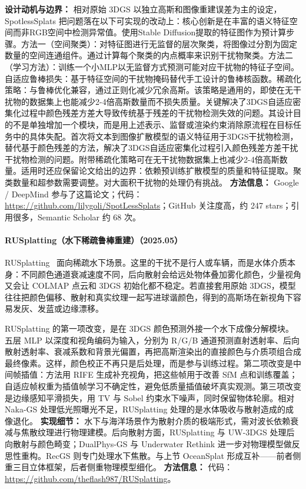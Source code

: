 \textbf{设计动机与边界：} 相对原始 3DGS 以独立高斯和图像重建误差为主的设定，SpotlessSplats 把问题落在以下可实现的改动上：核心创新是在丰富的语义特征空间而非RGB空间中检测异常值。使用Stable Diffusion提取的特征图作为预计算步骤。方法一（空间聚类）：对特征图进行无监督的层次聚类，将图像过分割为固定数量的空间连通组件。通过计算每个聚类的内点概率来识别干扰物聚类。方法二（学习方法）：训练一个小MLP以无监督方式预测可能对应干扰物的特征子空间。自适应鲁棒损失：基于特征空间的干扰物掩码替代手工设计的鲁棒核函数。稀疏化策略：与鲁棒优化兼容，通过正则化减少冗余高斯。该策略是通用的，即使在无干扰物的数据集上也能减少2-4倍高斯数量而不损失质量。关键解决了3DGS自适应密集化过程中颜色残差方差大导致传统基于残差的干扰物检测失效的问题。其设计目的不是单独增加一个模块，而是用上述表示、监督或渲染约束消除原流程在目标任务中的具体失配。首次将文本到图像扩散模型的语义特征用于3DGS干扰物检测，替代基于颜色残差的方法，解决了3DGS自适应密集化过程引入颜色残差方差干扰干扰物检测的问题。附带稀疏化策略可在无干扰物数据集上也减少2-4倍高斯数量。适用时还应保留论文给出的边界：依赖预训练扩散模型的质量和特征提取。聚类数量和超参数需要调整。对大面积干扰物的处理仍有挑战。
\textbf{方法信息：} Google / DeepMind 参与了这篇论文；代码：\url{https://github.com/lilygoli/SpotLessSplats}；GitHub 关注度高，约 247 stars；引用很多，Semantic Scholar 约 68 次。



\paragraph{RUSplatting（水下稀疏鲁棒重建）（2025.05）}
RUSplatting~\cite{2505_15737} 面向稀疏水下场景。这里的干扰不是行人或车辆，而是水体介质本身：不同颜色通道衰减速度不同，后向散射会给远处物体叠加雾化颜色，少量视角又会让 COLMAP 点云和 3DGS 初始化都不稳定。若直接套用原始 3DGS，模型往往把颜色偏移、散射和真实纹理一起写进球谐颜色，得到的高斯场在新视角下容易发灰、发蓝或边缘漂移。

RUSplatting 的第一项改变，是在 3DGS 颜色预测外接一个水下成像分解模块。五层 MLP 以深度和视角编码为输入，分别为 R/G/B 通道预测直射透射率、后向散射透射率、衰减系数和背景光偏置，再把高斯渲染出的直接颜色与介质项组合成最终像素。这样，颜色校正不再只是后处理，而是参与训练过程。第二项改变是中间帧插值：方法用 RIFE 生成补充视角，把这些帧用于改善 SfM 点和训练覆盖；自适应帧权重为插值帧学习不确定性，避免低质量插值破坏真实观测。第三项改变是边缘感知平滑损失，用 TV 与 Sobel 约束水下噪声，同时保留物体轮廓。相对 Naka-GS 处理低光照曝光不足，RUSplatting 处理的是水体吸收与散射造成的成像退化。
\textbf{实现细节：} 水下与海洋场景作为散射介质的极端形式，需对波长依赖衰减与焦散纹理进行物理建模。后向散射方面，RUSplatting 与 UW-3DGS 处理后向散射与颜色畸变；DualPhys-GS 与 Underwater Rethink 进一步对物理模型做反思性重构。RecGS 则专门处理水下焦散。与上节 OceanSplat 形成互补——前者侧重三目立体框架，后者侧重物理模型细化。
\textbf{方法信息：} 代码：\url{https://github.com/theflash987/RUSplatting}。



